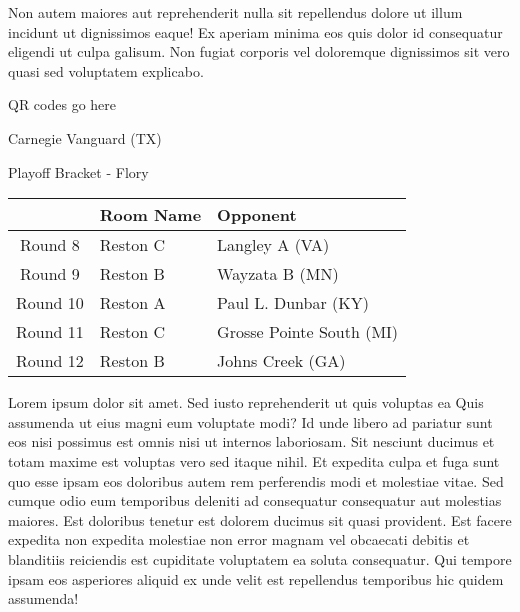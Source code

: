 \documentclass{article}%
\begin{document}
\newline%
Non autem maiores aut reprehenderit nulla sit repellendus dolore ut illum incidunt ut dignissimos eaque! Ex aperiam minima eos quis dolor id consequatur eligendi ut culpa galisum. Non fugiat corporis vel doloremque dignissimos sit vero quasi sed voluptatem explicabo.\newline%
\newline%
%
\vspace*{30pt}%
\begin{center}%
\begin{Huge}%
QR codes go here%
\end{Huge}%
\end{center}%
\newpage%
\begin{center}%
\begin{Huge}%
Carnegie Vanguard (TX)%
\end{Huge}%
\vspace*{8pt}%
\linebreak%
\begin{Large}%
Playoff Bracket {-} Flory%
\end{Large}%
\end{center}%
\begin{tabularx}{\textwidth}{|c|Y|Y|}%
\hline%
&Room Name&Opponent\\%
\hline%
Round 8&Reston C&Langley A (VA)\\%
Round 9&Reston B&Wayzata B (MN)\\%
Round 10&Reston A&Paul L. Dunbar (KY)\\%
Round 11&Reston C&Grosse Pointe South (MI)\\%
Round 12&Reston B&Johns Creek (GA)\\%
\hline%
\end{tabularx}%
\vspace*{8pt}%
\linebreak%
\newline%
\newline%
Lorem ipsum dolor sit amet. Sed iusto reprehenderit ut quis voluptas ea Quis assumenda ut eius magni eum voluptate modi? Id unde libero ad pariatur sunt eos nisi possimus est omnis nisi ut internos laboriosam. Sit nesciunt ducimus et totam maxime est voluptas vero sed itaque nihil. Et expedita culpa et fuga sunt quo esse ipsam eos doloribus autem rem perferendis modi et molestiae vitae.\newline%
\newline%
Sed cumque odio eum temporibus deleniti ad consequatur consequatur aut molestias maiores. Est doloribus tenetur est dolorem ducimus sit quasi provident. Est facere expedita non expedita molestiae non error magnam vel obcaecati debitis et blanditiis reiciendis est cupiditate voluptatem ea soluta consequatur. Qui tempore ipsam eos asperiores aliquid ex unde velit est repellendus temporibus hic quidem assumenda!\newline%
\end{document}
